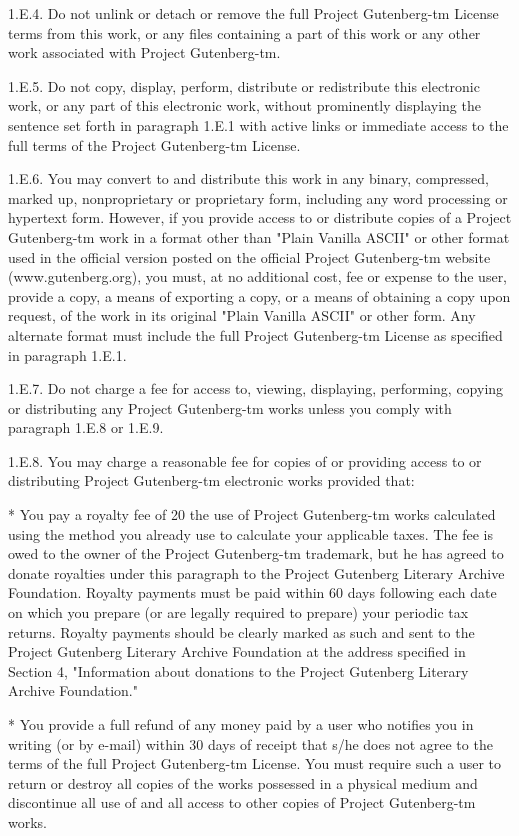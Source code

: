 1.E.4. Do not unlink or detach or remove the full Project Gutenberg-tm
License terms from this work, or any files containing a part of this
work or any other work associated with Project Gutenberg-tm.

1.E.5. Do not copy, display, perform, distribute or redistribute this
electronic work, or any part of this electronic work, without
prominently displaying the sentence set forth in paragraph 1.E.1 with
active links or immediate access to the full terms of the Project
Gutenberg-tm License.

1.E.6. You may convert to and distribute this work in any binary,
compressed, marked up, nonproprietary or proprietary form, including
any word processing or hypertext form. However, if you provide access
to or distribute copies of a Project Gutenberg-tm work in a format
other than "Plain Vanilla ASCII" or other format used in the official
version posted on the official Project Gutenberg-tm website
(www.gutenberg.org), you must, at no additional cost, fee or expense
to the user, provide a copy, a means of exporting a copy, or a means
of obtaining a copy upon request, of the work in its original "Plain
Vanilla ASCII" or other form. Any alternate format must include the
full Project Gutenberg-tm License as specified in paragraph 1.E.1.

1.E.7. Do not charge a fee for access to, viewing, displaying,
performing, copying or distributing any Project Gutenberg-tm works
unless you comply with paragraph 1.E.8 or 1.E.9.

1.E.8. You may charge a reasonable fee for copies of or providing
access to or distributing Project Gutenberg-tm electronic works
provided that:

* You pay a royalty fee of 20%
  the use of Project Gutenberg-tm works calculated using the method
  you already use to calculate your applicable taxes. The fee is owed
  to the owner of the Project Gutenberg-tm trademark, but he has
  agreed to donate royalties under this paragraph to the Project
  Gutenberg Literary Archive Foundation. Royalty payments must be paid
  within 60 days following each date on which you prepare (or are
  legally required to prepare) your periodic tax returns. Royalty
  payments should be clearly marked as such and sent to the Project
  Gutenberg Literary Archive Foundation at the address specified in
  Section 4, "Information about donations to the Project Gutenberg
  Literary Archive Foundation."

* You provide a full refund of any money paid by a user who notifies
  you in writing (or by e-mail) within 30 days of receipt that s/he
  does not agree to the terms of the full Project Gutenberg-tm
  License. You must require such a user to return or destroy all
  copies of the works possessed in a physical medium and discontinue
  all use of and all access to other copies of Project Gutenberg-tm
  works.

